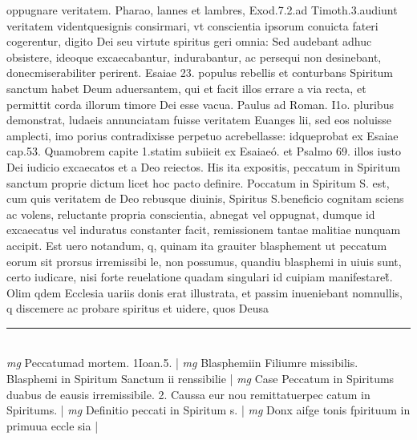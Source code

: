 \documentclass{article}
\begin{document}
\begin{pages}
oppugnare veritatem. Pharao, lannes et lambres, Exod.7.2.ad Timoth.3.audiunt veritatem videntquesignis consirmari, vt conscientia ipsorum conuicta fateri cogerentur, digito Dei seu virtute spiritus geri omnia: Sed audebant adhuc obsistere, ideoque  excaecabantur, indurabantur, ac persequi non desinebant, donecmiserabiliter perirent. Esaiae 23. populus rebellis et conturbans Spiritum sanctum habet Deum aduersantem, qui et facit illos errare a via recta, et permittit corda illorum timore Dei esse vacua. Paulus ad Roman. I1o. pluribus demonstrat, ludaeis annunciatam fuisse veritatem Euanges lii, sed eos noluisse amplecti, imo porius contradixisse perpetuo acrebellasse: idqueprobat ex Esaiae cap.53. Quamobrem capite 1.statim subiieit ex Esaiaeó. et Psalmo 69. illos iusto Dei iudicio excaecatos et a Deo reiectos. His ita expositis, peccatum in Spiritum sanctum proprie dictum licet hoc pacto definire.  \pend\pstart Poccatum in Spiritum S. est, cum quis veritatem de Deo rebusque  diuinis, Spiritus S.beneficio cognitam sciens ac volens, reluctante propria conscientia, abnegat vel oppugnat, dumque  id excaecatus vel induratus constanter facit, remissionem tantae malitiae nunquam accipit. Est uero notandum, q, quinam ita grauiter blasphement ut peccatum eorum sit prorsus irremissibi le, non possumus, quandiu blasphemi in uiuis sunt, certo iudicare, nisi forte reuelatione quadam singulari id cuipiam manifestaret̃. Olim qdem Ecclesia uariis donis erat illustrata, et passim inueniebant nomnullis, q discemere ac probare spiritus et uidere, quos Deusa  \pend
\vspace{0.5cm}\noindent
\vspace{0.2cm}\rule{1cm}{0.2pt}\\ 
\hspace{0.2cm}\textit{mg}
\footnotesize Peccatumad mortem. 1Ioan.5. 
\normalsize| 
\hspace{0.2cm}\textit{mg}
\footnotesize Blasphemiin Filiumre missibilis. Blasphemi in Spiritum Sanctum ii renssibilie 
\normalsize| 
\hspace{0.2cm}\textit{mg}
\footnotesize Case Peccatum in Spiritums duabus de eausis irremissibile. 2. Caussa eur nou remittatuerpec catum in Spiritums. 
\normalsize| 
\hspace{0.2cm}\textit{mg}
\footnotesize Definitio peccati in Spiritum s. 
\normalsize| 
\hspace{0.2cm}\textit{mg}
\footnotesize Donx aifge tonis fpirituum in primuua eccle sia 
\normalsize| 

\end{pages}
\end{document}

